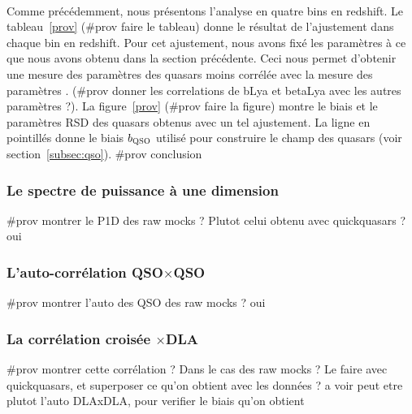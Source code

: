 \documentclass[11pt, twoside, a4paper, openright]{report}
\begin{document}
\paragraph{}
Comme précédemment, nous présentons l'analyse en quatre bins en redshift.
Le tableau~\ref{prov} (\#prov faire le tableau) donne le résultat de l'ajustement dans chaque bin en redshift. Pour cet ajustement, nous avons fixé les paramètres \lya{} à ce que nous avons obtenu dans la section précédente. Ceci nous permet d'obtenir une mesure des paramètres des quasars moins corrélée avec la mesure des paramètres \lya{}. (\#prov donner les correlations de bLya et betaLya avec les autres paramètres ?).
La figure~\ref{prov} (\#prov faire la figure) montre le biais et le paramètres RSD des quasars obtenus avec un tel ajustement.
La ligne en pointillés donne le biais $b_{\textsc{QSO}}$ utilisé pour construire le champ des quasars (voir section~\ref{subsec:qso}).
\#prov conclusion



\subsubsection{Le spectre de puissance à une dimension}

\#prov montrer le P1D des raw mocks ? Plutot celui obtenu avec quickquasars ?
oui


\subsubsection{L'auto-corrélation QSO$\times$QSO}

\#prov montrer l'auto des QSO des raw mocks ?
oui


\subsubsection{La corrélation croisée \lya$\times$DLA}

\#prov montrer cette corrélation ? Dans le cas des raw mocks ?
Le faire avec quickquasars, et superposer ce qu'on obtient avec les données ?
a voir peut etre plutot l'auto DLAxDLA, pour verifier le biais qu'on obtient
\end{document}
